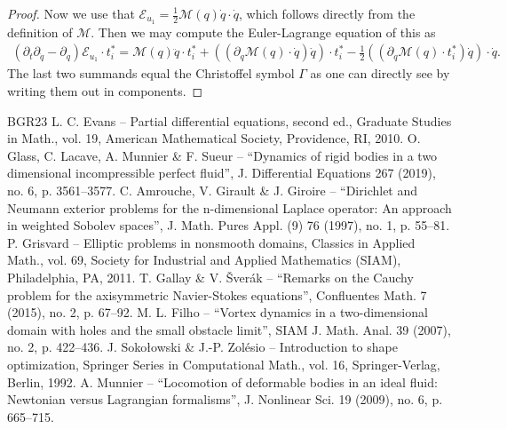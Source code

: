 \documentclass[10pt]{amsart}
\theoremstyle{definition}
\newcommand\eq{=}
\let\de\partial
\begin{document}
\begin{proof}
Now we use that $\mathcal{E}_{u_1}=\frac{1}{2}\mathcal{M}(q)\dot{q}\cdot\dot{q}$, which follows directly from the definition of $\mathcal{M}$. Then we may compute the Euler-Lagrange equation of this as
\begin{align*}
(\de_t\de_{\dot{q}}-\de_{q})\mathcal{E}_{u_1}\cdot t_i^*\eq \mathcal{M}(q)\ddot{q}\cdot t_i^*+((\de_q\mathcal{M}(q)\cdot \dot{q})\dot{q})\cdot t_i^*-\frac{1}{2}((\de_q\mathcal{M}(q)\cdot t_i^*)\dot{q})\cdot\dot{q}.
\end{align*}
The last two summands equal the Christoffel symbol $\Gamma$ as one can directly see by writing them out in components.
\end{proof}
\begin{thebibliography}{BGR23}
 L. C. Evans – Partial differential equations, second ed., Graduate Studies in Math., vol. 19, American Mathematical Society, Providence, RI, 2010.
 O. Glass, C. Lacave, A. Munnier \& F. Sueur – “Dynamics of rigid bodies in a two dimensional incompressible perfect fluid”, J. Differential Equations 267 (2019), no. 6, p. 3561–3577.
 C. Amrouche, V. Girault \& J. Giroire – “Dirichlet and Neumann exterior problems for the n-dimensional Laplace operator: An approach in weighted Sobolev spaces”, J. Math. Pures Appl. (9) 76 (1997), no. 1, p. 55–81.
 P. Grisvard – Elliptic problems in nonsmooth domains, Classics in Applied Math., vol. 69, Society for Industrial and Applied Mathematics (SIAM), Philadelphia, PA, 2011.
 T. Gallay \& V. Šverák – “Remarks on the Cauchy problem for the axisymmetric Navier-Stokes equations”, Confluentes Math. 7 (2015), no. 2, p. 67–92.
 M. L. Filho – “Vortex dynamics in a two-dimensional domain with holes and the small obstacle limit”, SIAM J. Math. Anal. 39 (2007), no. 2, p. 422–436.
 J. Sokołowski \& J.-P. Zolésio – Introduction to shape optimization, Springer Series in Computational Math., vol. 16, Springer-Verlag, Berlin, 1992.
 A. Munnier – “Locomotion of deformable bodies in an ideal fluid: Newtonian versus Lagrangian formalisms”, J. Nonlinear Sci. 19 (2009), no. 6, p. 665–715.
\end{thebibliography}
\end{document}

